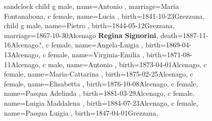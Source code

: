 \documentclass{article}
\begin{document}
\begin{figure}
\begin{minipage}[b]{0.39\textwidth}
\centering

    \begin{genealogypicture}[
        processing=database,
        database format=full,
        node size=3.5cm,
        level size=2.8cm,
        level distance=6mm,
        list separators hang=3mm,
        name font=\bfseries,
        surn code={\textcolor{black!50!black}{#1}},
        place text={\newline}{},
        date format=d month yyyy,
        tcbset={male/.style={colframe=blue,colback=blue!5},
        female/.style={colframe=red,colback=red!5}},
        box={fit basedim=7pt,boxsep=2pt,segmentation style=solid,
            halign=left,before upper=\parskip1pt,
            \gtrDBsex,
        },
    ]
    sandclock
    {
        child{
            g{
                male,
                name={Antonio },
                marriage={Maria Fontanabona}{},
            }
            c{
                female,
                name={Lucia },
                birth={1841-10-23}{Grezzana},
            }
            child{
                g{
                    male,
                    name={Pietro },
                    birth={1844-05-12}{Grezzana},
                    marriage={1867-10-30}{Alcenago \newline \textbf{Regina Signorini}},
                    death={1887-11-16}{Alcenago?},
                }
                c{
                    female,
                    name={Angela-Luigia },
                    birth={1869-04-13}{Alcenago},
                }
                c{
                    female,
                    name={Virginia-Emilia },
                    birth={1871-08-11}{Alcenago},
                }
                c{
                    male,
                    name={Antonio },
                    birth={1873-04-01}{Alcenago},
                }
                c{
                    female,
                    name={Maria-Cattarina },
                    birth={1875-02-25}{Alcenago},
                }
                c{
                    female,
                    name={Elisabetta },
                    birth={1876-10-08}{Alcenago},
                }
                c{
                    female,
                    name={Pasqua Adelinda },
                    birth={1881-03-29}{Alcenago},
                }
                c{
                    female,
                    name={Luigia Maddalena },
                    birth={1884-07-23}{Alcenago},
                }
            }
            c{
                female,
                name={Pasqua Luigia },
                birth={1847-04-01}{Grezzana},
            }
        }
    }
    \end{genealogypicture}


\end{minipage}
\end{figure}
\end{document}
